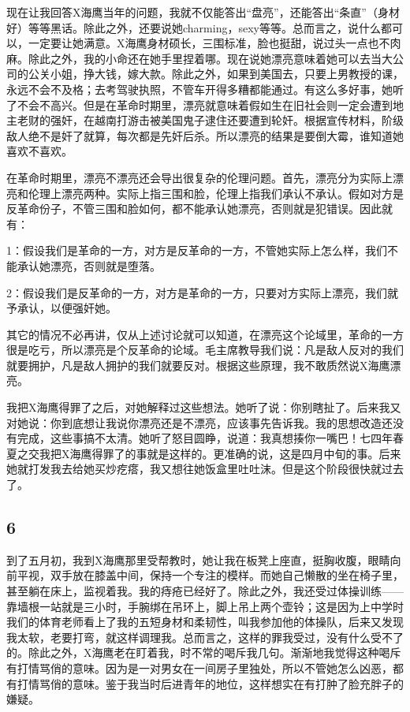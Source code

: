 现在让我回答X海鹰当年的问题，我就不仅能答出“盘亮”，还能答出“条直”（身材好）等等黑话。除此之外，还要说她charming，sexy等等。总而言之，说什么都可以，一定要让她满意。X海鹰身材硕长，三围标准，脸也挺甜，说过头一点也不肉麻。除此之外，我的小命还在她手里捏着哪。现在说她漂亮意味着她可以去当大公司的公关小姐，挣大钱，嫁大款。除此之外，如果到美国去，只要上男教授的课，永远不会不及格；去考驾驶执照，不管车开得多糟都能通过。有这么多好事，她听了不会不高兴。但是在革命时期里，漂亮就意味着假如生在旧社会则一定会遭到地主老财的强奸，在越南打游击被美国鬼子逮住还要遭到轮奸。根据宣传材料，阶级敌人绝不是奸了就算，每次都是先奸后杀。所以漂亮的结果是要倒大霉，谁知道她喜欢不喜欢。 

在革命时期里，漂亮不漂亮还会导出很复杂的伦理问题。首先，漂亮分为实际上漂亮和伦理上漂亮两种。实际上指三围和脸，伦理上指我们承认不承认。假如对方是反革命份子，不管三围和脸如何，都不能承认她漂亮，否则就是犯错误。因此就有： 

1：假设我们是革命的一方，对方是反革命的一方，不管她实际上怎么样，我们不能承认她漂亮，否则就是堕落。 

2：假设我们是反革命的一方，对方是革命的一方，只要对方实际上漂亮，我们就予承认，以便强奸她。 

其它的情况不必再讲，仅从上述讨论就可以知道，在漂亮这个论域里，革命的一方很是吃亏，所以漂亮是个反革命的论域。毛主席教导我们说：凡是敌人反对的我们就要拥护，凡是敌人拥护的我们就要反对。根据这些原理，我不敢质然说X海鹰漂亮。 

我把X海鹰得罪了之后，对她解释过这些想法。她听了说：你别瞎扯了。后来我又对她说：你到底想让我说你漂亮还是不漂亮，应该事先告诉我。我的思想改造还没有完成，这些事搞不太清。她听了怒目圆睁，说道：我真想揍你一嘴巴！七四年春夏之交我把X海鹰得罪了的事就是这样的。更准确的说，这是四月中旬的事。后来她就打发我去给她买炒疙瘩，我又想往她饭盒里吐吐沫。但是这个阶段很快就过去了。

\subsection{6}

到了五月初，我到X海鹰那里受帮教时，她让我在板凳上座直，挺胸收腹，眼睛向前平视，双手放在膝盖中间，保持一个专注的模样。而她自己懒散的坐在椅子里，甚至躺在床上，监视着我。我的痔疮已经好了。除此之外，我还受过体操训练——靠墙根一站就是三小时，手腕绑在吊环上，脚上吊上两个壶铃；这是因为上中学时我们的体育老师看上了我的五短身材和柔韧性，叫我参加他的体操队，后来又发现我太软，老要打弯，就这样调理我。总而言之，这样的罪我受过，没有什么受不了的。除此之外，X海鹰老在盯着我，时不常的喝斥我几句。渐渐地我觉得这种喝斥有打情骂俏的意味。因为是一对男女在一间房子里独处，所以不管她怎么凶恶，都有打情骂俏的意味。鉴于我当时后进青年的地位，这样想实在有打肿了脸充胖子的嫌疑。 

